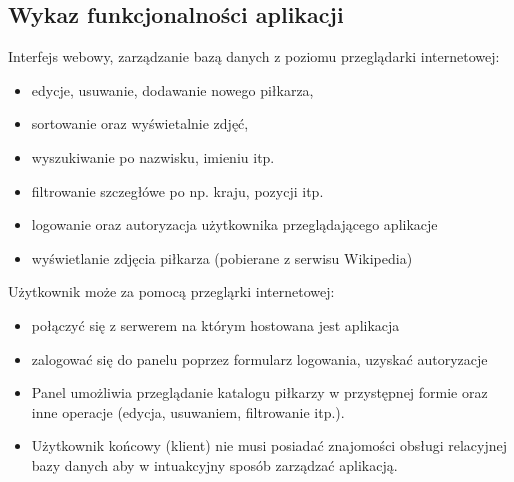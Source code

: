 \subsection{Wykaz funkcjonalności aplikacji}
    \begin{flushleft}
        Interfejs webowy, zarządzanie bazą danych z poziomu przeglądarki internetowej:

        \begin{itemize}
            \item edycje, usuwanie, dodawanie nowego piłkarza,
            \item sortowanie oraz wyświetalnie zdjęć,
            \item wyszukiwanie po nazwisku, imieniu itp.
            \item filtrowanie szczegłówe po np. kraju, pozycji itp.
            \item logowanie oraz autoryzacja użytkownika przeglądającego aplikacje
            \item wyświetlanie zdjęcia piłkarza (pobierane z serwisu Wikipedia)\newline\newline
        \end{itemize}


         Użytkownik może za pomocą przegląrki internetowej:
        \begin{itemize}
            \item  połączyć się z serwerem na którym hostowana jest aplikacja
            \item zalogować się do panelu poprzez formularz logowania, uzyskać autoryzacje
            \item Panel umożliwia przeglądanie katalogu  piłkarzy w przystępnej formie oraz inne operacje (edycja, usuwaniem, filtrowanie itp.).
            \item Użytkownik końcowy (klient) nie musi posiadać znajomości obsługi relacyjnej bazy danych aby w intuakcyjny sposób zarządzać aplikacją.
        \end{itemize}


    \end{flushleft}
    \pagebreak

